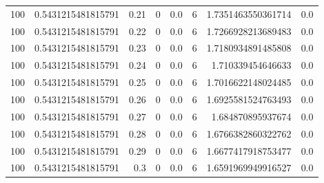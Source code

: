 \documentclass[11pt]{article}
\begin{document}
\begin{center}
\begin{tabular}{rrrrrrrr}
100 & 0.5431215481815791 & 0.21 & 0 & 0.0 & 6 & 1.7351463550361714 & 0.0\\
100 & 0.5431215481815791 & 0.22 & 0 & 0.0 & 6 & 1.7266928213689483 & 0.0\\
100 & 0.5431215481815791 & 0.23 & 0 & 0.0 & 6 & 1.7180934891485808 & 0.0\\
100 & 0.5431215481815791 & 0.24 & 0 & 0.0 & 6 & 1.710339454646633 & 0.0\\
100 & 0.5431215481815791 & 0.25 & 0 & 0.0 & 6 & 1.7016622148024485 & 0.0\\
100 & 0.5431215481815791 & 0.26 & 0 & 0.0 & 6 & 1.6925581524763493 & 0.0\\
100 & 0.5431215481815791 & 0.27 & 0 & 0.0 & 6 & 1.684870895937674 & 0.0\\
100 & 0.5431215481815791 & 0.28 & 0 & 0.0 & 6 & 1.6766382860322762 & 0.0\\
100 & 0.5431215481815791 & 0.29 & 0 & 0.0 & 6 & 1.6677417918753477 & 0.0\\
100 & 0.5431215481815791 & 0.3 & 0 & 0.0 & 6 & 1.6591969949916527 & 0.0\\
\end{tabular}
\end{center}
\end{document}
